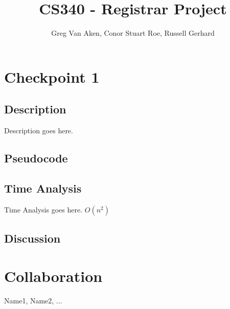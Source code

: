 \documentclass[11pt, oneside]{article}   	%
\title{CS340 - Registrar Project}
\author{Greg Van Aken, Conor Stuart Roe, Russell Gerhard}
\begin{document}
\maketitle

\section{Checkpoint 1}
\subsection{Description}
Description goes here.

\subsection{Pseudocode}
\begin{algorithm}
\end{algorithm}

\subsection{Time Analysis}
Time Analysis goes here. $O(n^2)$


\subsection{Discussion}

\section*{Collaboration}
Name1, Name2, ...
\end{document}

